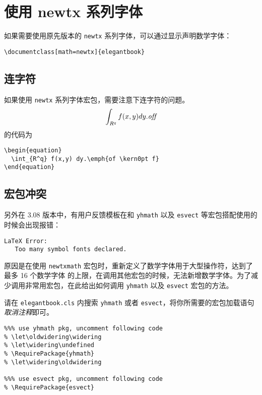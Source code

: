 \documentclass[lang=cn,10pt]{elegantbook}
\begin{document}
\section{使用 newtx 系列字体}

如果需要使用原先版本的 \lstinline{newtx} 系列字体，可以通过显示声明数学字体：

\begin{lstlisting}
\documentclass[math=newtx]{elegantbook}
\end{lstlisting}

\subsection{连字符}

如果使用 \lstinline{newtx} 系列字体宏包，需要注意下连字符的问题。
\begin{equation}
  \int_{R^q} f(x,y) dy.\emph{of\kern0pt f}
\end{equation}
的代码为
\begin{lstlisting}
\begin{equation}
  \int_{R^q} f(x,y) dy.\emph{of \kern0pt f}
\end{equation}
\end{lstlisting}

\subsection{宏包冲突}

另外在 3.08 版本中，有用户反馈模板在和 \lstinline{yhmath} 以及 \lstinline{esvect} 等宏包搭配使用的时候会出现报错：
\begin{lstlisting}
LaTeX Error:
   Too many symbol fonts declared.
\end{lstlisting}

原因是在使用 \lstinline{newtxmath} 宏包时，重新定义了数学字体用于大型操作符，达到了 {\heiti 最多 16 个数学字体} 的上限，在调用其他宏包的时候，无法新增数学字体。为了减少调用非常用宏包，在此给出如何调用 \lstinline{yhmath} 以及 \lstinline{esvect} 宏包的方法。

请在 \lstinline{elegantbook.cls} 内搜索 \lstinline{yhmath} 或者 \lstinline{esvect}，将你所需要的宏包加载语句\textit{取消注释}即可。
\begin{lstlisting}
%%% use yhmath pkg, uncomment following code
% \let\oldwidering\widering
% \let\widering\undefined
% \RequirePackage{yhmath}
% \let\widering\oldwidering

%%% use esvect pkg, uncomment following code
% \RequirePackage{esvect}
\end{lstlisting}
\end{document}

